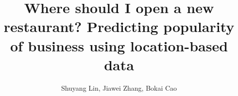 


\title{Where should I open a new restaurant? Predicting popularity of business using location-based data}
\author{
Shuyang Lin, Jiawei Zhang, Bokai Cao\\
}
\date{}
\maketitle



%


